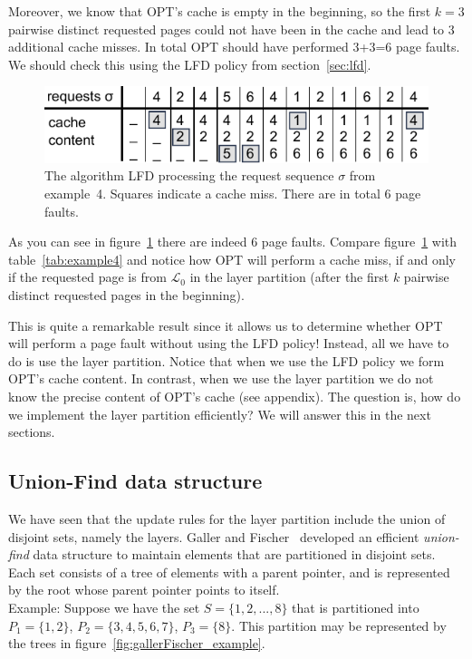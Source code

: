 \documentclass[a4paper,12pt, titlepage]{article}  %
\newcommand{\cl}{\mathcal{L}}   %
\begin{document}
Moreover, we know that OPT's cache is empty in the beginning, so the first $k=3$ pairwise distinct requested pages
could not have been in the cache and lead to 3 additional cache misses. In total OPT should 
have performed 3+3=6 page faults. We should check this using the LFD policy from section~\ref{sec:lfd}.

\begin{figure}[h]
	\centering
	\includegraphics{./figures/LFD_compare_layerPartition2.pdf}
	\caption{The algorithm LFD processing the request sequence $\sigma$ from example~4.
					 Squares indicate a cache miss. There are in total 6 page faults.}
	\label{fig:LFD_compare_layerPartition2}
\end{figure}


\noindent As you can see in figure~\ref{fig:LFD_compare_layerPartition2} there are indeed 6 page faults. Compare figure~\ref{fig:LFD_compare_layerPartition2} with table~\ref{tab:example4}
and notice how OPT will perform a cache miss, if and only if the requested page is from $\cl_0$ in the layer partition
(after the first $k$ pairwise distinct requested pages in the beginning). 

This is quite a remarkable result since it allows us to determine whether OPT will perform a page fault without 
using the LFD policy! Instead, all we have to do is use the layer partition. Notice that when we use the LFD policy
we form OPT's cache content. In contrast, when we use the layer partition we do not know the precise content of OPT's cache (see appendix). 
The question is, how do we implement the layer partition efficiently? We will answer this in the next sections.  
 

\subsection{Union-Find data structure}
We have seen that the update rules for the layer partition include the union of disjoint sets, namely the layers. 
Galler and Fischer~\cite{galler64} developed an efficient \emph{union-find} data structure to maintain elements that are partitioned in disjoint sets. Each set consists of a tree of elements with a parent pointer, and is 
represented by the root whose parent pointer points to itself.\\
Example: Suppose we have the set $S=\{1,2,...,8\}$ that is partitioned into $P_1=\{1,2\}$, $P_2=\{3,4,5,6,7\}$, 
$P_3=\{8\}$. This partition may be represented by the trees in figure~\ref{fig:gallerFischer_example}. 
\end{document}
